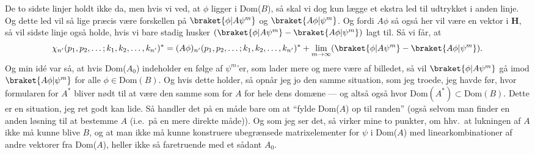 \documentclass{report}
\begin{document}
De to sidste linjer holdt ikke da, men hvis vi ved, at $\phi$ ligger i Dom($B$), så skal vi dog kun lægge et ekstra led til udtrykket i anden linje. Og dette led vil så lige præcis være forskellen på $\braket{\phi | A \psi^m}$ og $\braket{A \phi | \psi^m}$. Og fordi $A \phi$ så også her vil være en vektor i \textbf{H}, så vil sidste linje også holde, hvis vi bare stadig husker $(\braket{\phi | A \psi^m} - \braket{A \phi | \psi^m})$ lagt til. Så vi får, at
\begin{align}
\begin{aligned}
	\chi_{n'}(p_1, p_2, \ldots; k_1, k_2, \ldots, k_{n'})^* =
		(A \phi)_{n'}(p_1, p_2, \ldots; k_1, k_2, \ldots, k_{n'})^* 
		+ \lim_{m\to\infty}(\braket{\phi | A \psi^m} - \braket{A \phi | \psi^m}).
		\label{chi-formel_lig_A_phi-formel1}
\end{aligned}
\end{align}
Og min idé var så, at hvis Dom($A_0$) indeholder en følge af $\psi^m$'er, som lader mere og mere være af billedet, så vil $\braket{\phi | A \psi^m}$ gå imod $\braket{A \phi | \psi^m}$ for alle $\phi\in\mathrm{Dom}(B)$. Og hvis dette holder, så opnår jeg jo den samme situation, som jeg troede, jeg havde før, hvor formularen for $A^*$ bliver nødt til at være den samme som for $A$ for hele dens domæne --- og altså også hvor $\mathrm{Dom}(A^*) \subset \mathrm{Dom}(B)$. Dette er en situation, jeg ret godt kan lide. Så handler det på en måde bare om at ``fylde Dom($A$) op til randen'' (også selvom man finder en anden løsning til at bestemme $A$ (i.e.\ på en mere direkte måde)). Og som jeg ser det, så virker mine to punkter, om hhv.\ at lukningen af $A$ ikke må kunne blive $B$, og at man ikke må kunne konstruere ubegrænsede matrixelementer for $\psi$ i Dom($A$) med linearkombinationer af andre vektorer fra Dom($A$), heller ikke så faretruende med et sådant $A_0$. 
\end{document}
